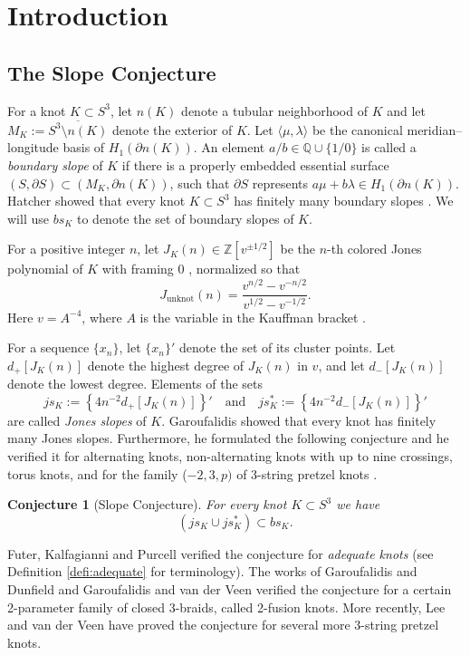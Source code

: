 \documentclass[11pt]{amsart}
\newtheorem{conjecture}[theorem]{Conjecture}
\theoremstyle{definition}
\newcommand{\QQ}{{\mathbb{Q}}}
\newcommand{\bdy}{{\partial}}
\def\BZ{\mathbb Z}
\begin{document}
\section{Introduction}

\subsection{The Slope Conjecture} For a knot $K \subset S^3$, let $n(K)$ denote a tubular neighborhood of
$K$ and let $M_K:=\overline{ S^3\setminus n(K)}$ denote the exterior of
$K$. Let $\langle \mu, \lambda \rangle$ be the canonical
meridian--longitude basis of $H_1 (\bdy n(K))$.  An element $a/b \in
{\QQ}\cup \{ 1/0\}$ is called a \emph{boundary slope} of $K$ if there
is a properly embedded essential surface $(S, \bdy S) \subset (M_K,
\bdy n(K))$, such that  $\bdy S$ represents $a \mu + b \lambda \in
H_1 (\bdy n(K))$.  Hatcher showed that every knot $K \subset S^3$
has finitely many boundary slopes \cite{hatcher}.
We will use $bs_K$ to denote the set of boundary slopes of $K$.

For a positive integer $n$, let $J_K(n) \in \BZ[v^{\pm 1/2}]$ be the $n$-th colored Jones polynomial of $K$ with framing 0 \cite{Jo, RT}, normalized so that $$J_{\text{unknot}}(n) = \frac{v^{n/2}- v^{-n/2}}{v^{1/2} -v^{-1/2}}.$$ 
Here $v=A^{-4}$, where $A$ is the variable in the Kauffman bracket \cite{Ka}.

For a sequence $\{x_n\}$, let $\{x_n\}'$ denote the set of its cluster points. Let $d_+[J_K(n)]$ denote the highest degree of $J_K(n)$ in $v$,
and let $d_-[J_K(n)]$ denote the lowest degree. Elements of the sets 
$$js_K:= \left\{ 4n^{-2}d_+[J_K(n)]  \right\}' \quad
 \mbox{and} \quad js^*_K:= \left\{ 4n^{-2}d_-[J_K(n)] \right\}' $$
 are called {\em Jones slopes} of $K$. 
 Garoufalidis   \cite{ga-quasi} showed that every knot has  finitely many Jones slopes.
Furthermore,   he formulated the following conjecture and he  verified it for alternating knots, non-alternating knots with up to nine crossings, torus knots, 
and for the family ($-2, 3, p)$ of 3-string pretzel  knots \cite{Ga-slope}.

\begin{conjecture} [Slope Conjecture] For every knot $K \subset S^3$ we have 
$$(js_K \cup js^*_K) \subset bs_K.$$
\end{conjecture}

 Futer, Kalfagianni and Purcell \cite{FKP}  verified the conjecture
for \emph{adequate knots} (see Definition \ref{defi:adequate} for terminology). The works of Garoufalidis and Dunfield \cite{DG} and
Garoufalidis and van der Veen \cite{GV} verified the conjecture for a certain 2-parameter family of closed 3-braids, called 2-fusion knots. More recently, Lee and van der Veen \cite{leV} have proved the conjecture for several more 3-string pretzel knots.
\end{document}
